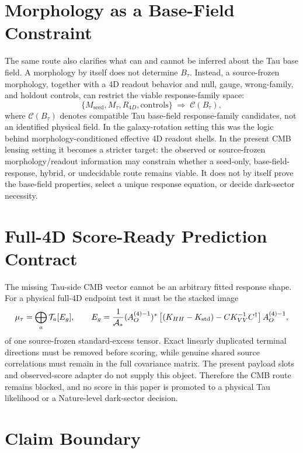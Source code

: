 \documentclass[11pt]{article}
\begin{document}
\section{Morphology as a Base-Field Constraint}

The same route also clarifies what can and cannot be inferred about the Tau
base field. A morphology by itself does not determine \(B_\tau\). Instead, a
source-frozen morphology, together with a 4D readout behavior and null, gauge,
wrong-family, and holdout controls, can restrict the viable response-family
space:
\[
\{M_{\mathrm{seed}},M_\tau,R_{4D},\mathrm{controls}\}
\;\Longrightarrow\;
\mathcal{C}(B_\tau),
\]
where \(\mathcal{C}(B_\tau)\) denotes compatible Tau base-field response-family
candidates, not an identified physical field. In the galaxy-rotation setting
this was the logic behind morphology-conditioned effective 4D readout shells.
In the present CMB lensing setting it becomes a stricter target: the observed
or source-frozen morphology/readout information may constrain whether a
seed-only, base-field-response, hybrid, or undecidable route remains viable.
It does not by itself prove the base-field properties, select a unique
response equation, or decide dark-sector necessity.


\section{Full-4D Score-Ready Prediction Contract}

The missing Tau-side CMB vector cannot be an arbitrary fitted response shape.
For a physical full-4D endpoint test it must be the stacked image
\[
 \mu_\tau=\bigoplus_a\mathcal T_a[E_g],
 \qquad
 E_g=\frac{1}{\mathcal A_*}(A_O^{(4)-1})^*
 \left[(K_{HH}-K_{\rm std})-CK_{VV}^{-1}C^\dagger\right]
 A_O^{(4)-1},
\]
of one source-frozen standard-excess tensor.  Exact linearly duplicated
terminal directions must be removed before scoring, while genuine shared
source correlations must remain in the full covariance matrix.  The present
payload slots and observed-score adapter do not supply this object.  Therefore
the CMB route remains blocked, and no score in this paper is promoted to a
physical Tau likelihood or a Nature-level dark-sector decision.

\section{Claim Boundary}
\label{sec:claim-boundary}
\end{document}
